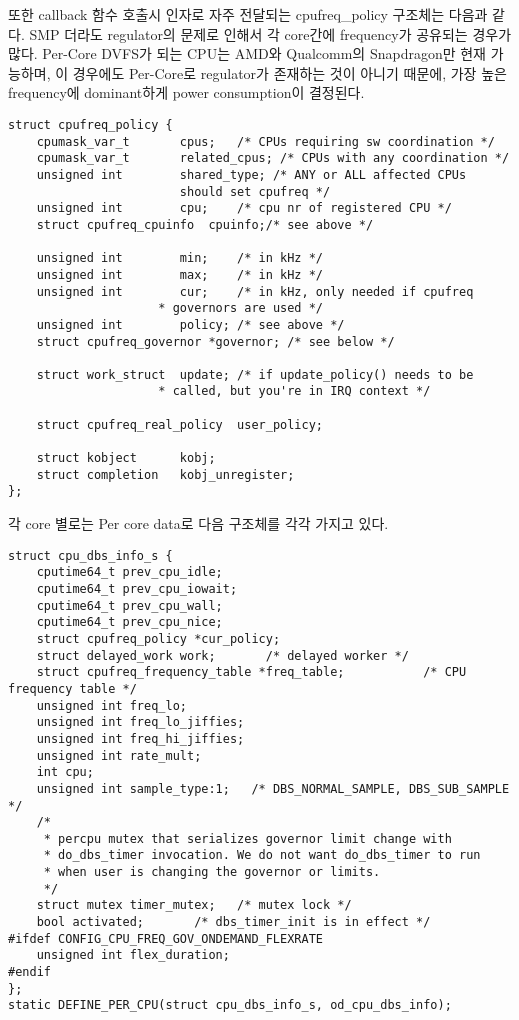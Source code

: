 \vspace{\baselineskip}

또한 callback 함수 호출시 인자로 자주 전달되는 cpufreq\_policy 구조체는 다음과 같다.
SMP 더라도 regulator의 문제로 인해서 각 core간에 frequency가 공유되는 경우가 많다.
Per-Core DVFS가 되는 CPU는 AMD와 Qualcomm의 Snapdragon만 현재 가능하며, 이 경우에도  Per-Core로 regulator가 존재하는 것이 아니기 때문에, 가장 높은 frequency에 dominant하게 power consumption이 결정된다. 
\begin{lstlisting}
struct cpufreq_policy { 
    cpumask_var_t       cpus;   /* CPUs requiring sw coordination */
    cpumask_var_t       related_cpus; /* CPUs with any coordination */
    unsigned int        shared_type; /* ANY or ALL affected CPUs
                        should set cpufreq */
    unsigned int        cpu;    /* cpu nr of registered CPU */
    struct cpufreq_cpuinfo  cpuinfo;/* see above */

    unsigned int        min;    /* in kHz */
    unsigned int        max;    /* in kHz */
    unsigned int        cur;    /* in kHz, only needed if cpufreq
                     * governors are used */
    unsigned int        policy; /* see above */
    struct cpufreq_governor *governor; /* see below */

    struct work_struct  update; /* if update_policy() needs to be
                     * called, but you're in IRQ context */

    struct cpufreq_real_policy  user_policy;

    struct kobject      kobj;
    struct completion   kobj_unregister;
};
\end{lstlisting}

\vspace{\baselineskip}

각 core 별로는 Per core data로 다음 구조체를 각각 가지고 있다. 
\begin{lstlisting}
struct cpu_dbs_info_s {
    cputime64_t prev_cpu_idle;
    cputime64_t prev_cpu_iowait;
    cputime64_t prev_cpu_wall;
    cputime64_t prev_cpu_nice;
    struct cpufreq_policy *cur_policy;      
    struct delayed_work work;       /* delayed worker */
    struct cpufreq_frequency_table *freq_table;           /* CPU frequency table */
    unsigned int freq_lo;
    unsigned int freq_lo_jiffies;
    unsigned int freq_hi_jiffies;
    unsigned int rate_mult;
    int cpu;
    unsigned int sample_type:1;   /* DBS_NORMAL_SAMPLE, DBS_SUB_SAMPLE */
    /*
     * percpu mutex that serializes governor limit change with
     * do_dbs_timer invocation. We do not want do_dbs_timer to run
     * when user is changing the governor or limits.
     */
    struct mutex timer_mutex;   /* mutex lock */
    bool activated;       /* dbs_timer_init is in effect */
#ifdef CONFIG_CPU_FREQ_GOV_ONDEMAND_FLEXRATE
    unsigned int flex_duration;
#endif
};
static DEFINE_PER_CPU(struct cpu_dbs_info_s, od_cpu_dbs_info);
\end{lstlisting}


